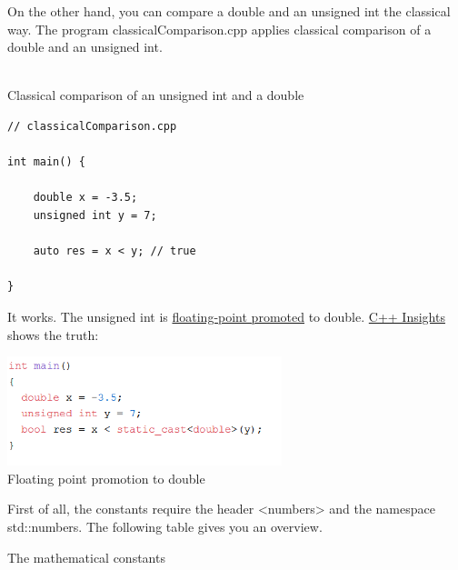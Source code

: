 On the other hand, you can compare a double and an unsigned int the classical way. The program classicalComparison.cpp applies classical comparison of a double and an unsigned int.

\hspace*{\fill} \\ %
\noindent
Classical comparison of an unsigned int and a double
\begin{lstlisting}[style=styleCXX]
// classicalComparison.cpp

int main() {
	
	double x = -3.5;
	unsigned int y = 7;
	
	auto res = x < y; // true
	
}
\end{lstlisting}

It works. The unsigned int is \href{https://en.cppreference.com/w/cpp/language/implicit_conversion}{floating-point promoted} to double. \href{https://cppinsights.io/s/44216566}{C++ Insights} shows the truth:

\begin{center}
\includegraphics[width=0.6\textwidth]{content/3/chapter5/images/1-5.png}\\
Floating point promotion to double
\end{center}


First of all, the constants require the header <numbers> and the namespace std::numbers. The following table gives you an overview.

\begin{center}
The mathematical constants
\end{center}

